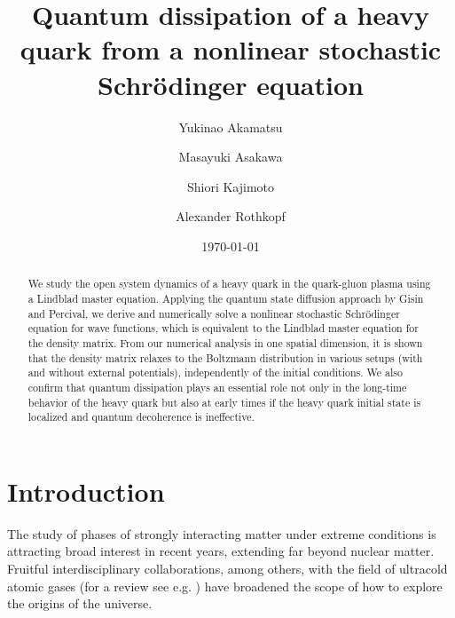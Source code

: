 \documentclass[prd,11pt, amsmath, amsymb, aps, reprint, tightenlines, nofootinbib, longbibliography, abbrv, preprintnumbers]{revtex4-1}
\begin{document}
\title{
Quantum dissipation of a heavy quark from a nonlinear stochastic Schr\"odinger equation
}

\author{Yukinao Akamatsu}

\author{Masayuki Asakawa}

\author{Shiori Kajimoto}

\author{Alexander Rothkopf}


\begin{abstract}
We study the open system dynamics of a heavy quark in the quark-gluon plasma using a Lindblad master equation.
Applying the quantum state diffusion approach by Gisin and Percival, we derive and numerically solve a nonlinear stochastic Schr\"odinger equation for wave functions, which is equivalent to the Lindblad master equation for the density matrix.
From our numerical analysis in one spatial dimension, it is shown that the density matrix relaxes to the Boltzmann distribution in various setups (with and without external potentials), independently of the initial conditions.
We also confirm that quantum dissipation plays an essential role not only in the long-time behavior of the heavy quark but also at early times if the heavy quark initial state is localized and quantum decoherence is ineffective.
\end{abstract}

\date{\today}

\maketitle

\section{Introduction}
The study of phases of strongly interacting matter under extreme conditions \cite{Akiba:2015jwa, Fukushima:2010bq} is attracting broad interest in recent years, extending far beyond nuclear matter.
Fruitful interdisciplinary collaborations, among others, with the field of ultracold atomic gases (for a review see e.g. \cite{Adams:2012th}) have broadened the scope of how to explore the origins of the universe. 
\end{document}

